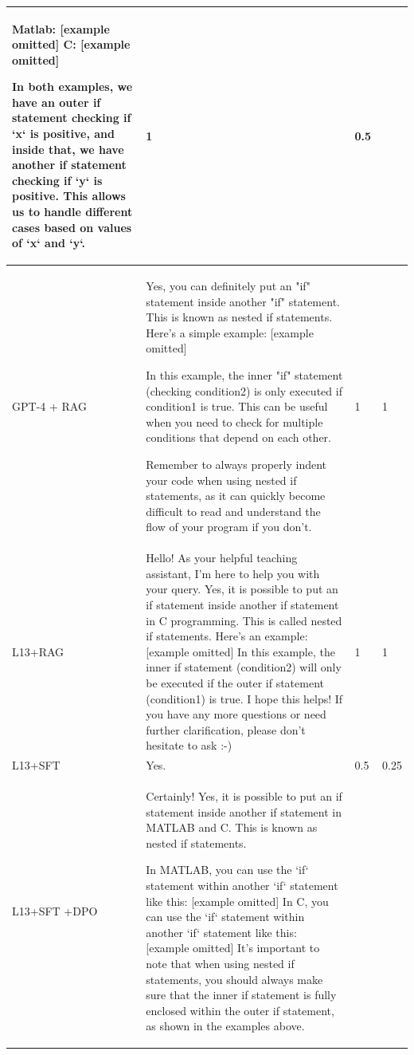 \begin{table}[!ht]
\begin{tabular}{p{} p{} p{} p{}}
Matlab: [example omitted]
C: [example omitted]

In both examples, we have an outer if statement checking if `x` is positive, and inside that, we have another if statement checking if `y` is positive. This allows us to handle different cases based on values of `x` and `y`.
& 1 & 0.5 \\
\midrule
GPT-4 + RAG & 
Yes, you can definitely put an "if" statement inside another "if" statement. This is known as nested if statements. Here's a simple example: [example omitted]

In this example, the inner "if" statement (checking condition2) is only executed if condition1 is true. This can be useful when you need to check for multiple conditions that depend on each other.

Remember to always properly indent your code when using nested if statements, as it can quickly become difficult to read and understand the flow of your program if you don't.
& 1 & 1 \\
\midrule
L13+RAG & %
Hello! As your helpful teaching assistant, I'm here to help you with your query. Yes, it is possible to put an if statement inside another if statement in C programming. This is called nested if statements. Here's an example: [example omitted]
In this example, the inner if statement (condition2) will only be executed if the outer if statement (condition1) is true.
I hope this helps! If you have any more questions or need further clarification, please don't hesitate to ask :-) %
& 1 & 1 \\
\midrule
L13+SFT & %
Yes.
& 0.5 & 0.25 \\
\midrule
L13+SFT +DPO & %
Certainly! Yes, it is possible to put an if statement inside another if statement in MATLAB and C. This is known as nested if statements.

In MATLAB, you can use the `if` statement within another `if` statement like this: [example omitted]
In C, you can use the `if` statement within another `if` statement like this: [example omitted]
It's important to note that when using nested if statements, you should always make sure that the inner if statement is fully enclosed within the outer if statement, as shown in the examples above.


\end{tabular}
\end{table}
